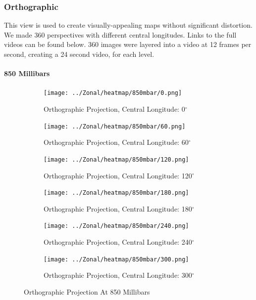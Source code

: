 \documentclass[hidelinks]{article}
\begin{document}
\subsubsection{Orthographic}
This view is used to create visually-appealing maps without significant distortion. We made 360 perspectives with different central longitudes. Links to the full videos can be found below. 360 images were layered into a video at 12 frames per second, creating a 24 second video, for each level.
\paragraph{850 Millibars}
\begin{figure}[h!]
	\centering
	\begin{subfigure}[b]{0.45545\linewidth}
		\texttt{[image: ../Zonal/heatmap/850mbar/0.png]}
		\caption{Orthographic Projection, Central Longitude: 0$^\circ$}
	\end{subfigure}
	\begin{subfigure}[b]{0.45545\linewidth}
		\texttt{[image: ../Zonal/heatmap/850mbar/60.png]}
		\caption{Orthographic Projection, Central Longitude: 60$^\circ$}
	\end{subfigure}
	\begin{subfigure}[b]{0.45545\linewidth}
		\texttt{[image: ../Zonal/heatmap/850mbar/120.png]}
		\caption{Orthographic Projection, Central Longitude: 120$^\circ$}
	\end{subfigure}
	\begin{subfigure}[b]{0.45545\linewidth}
		\texttt{[image: ../Zonal/heatmap/850mbar/180.png]}
		\caption{Orthographic Projection, Central Longitude: 180$^\circ$}
	\end{subfigure}
	\begin{subfigure}[b]{0.45545\linewidth}
		\texttt{[image: ../Zonal/heatmap/850mbar/240.png]}
		\caption{Orthographic Projection, Central Longitude: 240$^\circ$}
	\end{subfigure}
	\begin{subfigure}[b]{0.45545\linewidth}
		\texttt{[image: ../Zonal/heatmap/850mbar/300.png]}
		\caption{Orthographic Projection, Central Longitude: 300$^\circ$}
	\end{subfigure}
	\caption{Orthographic Projection At 850 Millibars}
\end{figure}
\newpage
\end{document}

